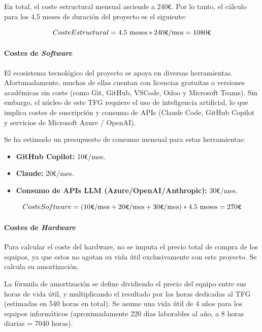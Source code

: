 \documentclass[11pt, letterpaper]{article}
\begin{document}
En total, el coste estructural mensual asciende a 240\verb|€|. Por lo tanto, el cálculo para los 4,5 meses de duración del proyecto es el siguiente:

\begin{equation}
    Coste Estructural = 4{.}5 \text{ meses} * 240\verb|€|/\text{mes} = 1080\verb|€|
\end{equation}

\paragraph{Costes de \textit{Software}}
\label{sec:costes_software}
El ecosistema tecnológico del proyecto se apoya en diversas herramientas. Afortunadamente, muchas de ellas cuentan con licencias gratuitas o versiones académicas sin coste (como Git, GitHub, VSCode, Odoo y Microsoft Teams). Sin embargo, el núcleo de este TFG requiere el uso de inteligencia artificial, lo que implica costes de suscripción y consumo de APIs (Claude Code, GitHub Copilot y servicios de Microsoft Azure / OpenAI).

Se ha estimado un presupuesto de consumo mensual para estas herramientas:
\begin{itemize}
    \item \textbf{GitHub Copilot:} 10\verb|€|/mes. \cite{github_pricing}
    \item \textbf{Claude:} 20\verb|€|/mes. \cite{claude_plans}
    \item \textbf{Consumo de APIs LLM (Azure/OpenAI/Anthropic):} 30\verb|€|/mes.
\end{itemize}
\begin{equation}
    Coste Software = (10\verb|€|/\text{mes}+ 20\verb|€|/\text{mes} + 30\verb|€|/\text{mes}) * 4{.}5 \text{ meses} = 270\verb|€|
\end{equation}

\paragraph{Costes de \textit{Hardware}}
\label{sec:costes_hardware}
Para calcular el coste del hardware, no se imputa el precio total de compra de los equipos, ya que estos no agotan su vida útil exclusivamente con este proyecto. Se calcula su amortización. 

La fórmula de amortización se define dividiendo el precio del equipo entre sus horas de vida útil, y multiplicando el resultado por las horas dedicadas al TFG (estimadas en 540 horas en total). Se asume una vida útil de 4 años para los equipos informáticos (aproximadamente 220 días laborables al año, a 8 horas diarias = 7040 horas).
\end{document}
